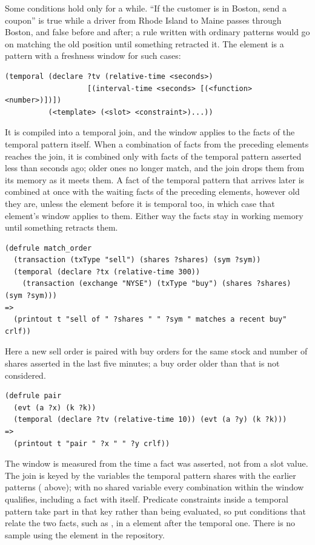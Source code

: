 Some conditions hold only for a while. ``If the customer is in Boston,
send a coupon'' is true while a driver from Rhode Island to Maine passes
through Boston, and false before and after; a rule written with ordinary
patterns would go on matching the old position until something
retracted it. The  element is a pattern with a freshness
window for such cases:

\begin{lstlisting}
(temporal (declare ?tv (relative-time <seconds>)
                   [(interval-time <seconds> [(<function> <number>)])])
          (<template> (<slot> <constraint>)...))
\end{lstlisting}

It is compiled into a temporal join, and the window applies to the facts
of the temporal pattern itself. When a combination of facts from the
preceding elements reaches the join, it is combined only with facts of
the temporal pattern asserted less than  seconds ago;
older ones no longer match, and the join drops them from its memory as it
meets them. A fact of the temporal pattern that arrives later is combined
at once with the waiting facts of the preceding elements, however old
they are, unless the element before it is temporal too, in which case
that element's window applies to them. Either way the facts stay in
working memory until something retracts them.

\begin{lstlisting}
(defrule match_order
  (transaction (txType "sell") (shares ?shares) (sym ?sym))
  (temporal (declare ?tx (relative-time 300))
    (transaction (exchange "NYSE") (txType "buy") (shares ?shares) (sym ?sym)))
=>
  (printout t "sell of " ?shares " " ?sym " matches a recent buy" crlf))
\end{lstlisting}

Here a new sell order is paired with buy orders for the same stock and
number of shares asserted in the last five minutes; a buy order older
than that is not considered.

\begin{lstlisting}
(defrule pair
  (evt (a ?x) (k ?k))
  (temporal (declare ?tv (relative-time 10)) (evt (a ?y) (k ?k)))
=>
  (printout t "pair " ?x " " ?y crlf))
\end{lstlisting}

The window is measured from the time a fact was asserted, not from a
slot value. The join is keyed by the variables the temporal pattern
shares with the earlier patterns ( above); with no shared
variable every combination within the window qualifies, including a
fact with itself. Predicate constraints inside a temporal pattern take
part in that key rather than being evaluated, so put conditions that
relate the two facts, such as , in a  element
after the temporal one. There is no sample using the element in the
repository.

